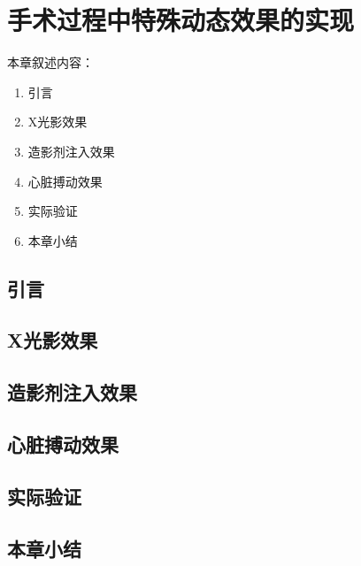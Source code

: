 \chapter{手术过程中特殊动态效果的实现}
\label{chap6}

本章叙述内容：
\begin{enumerate}
  \item 引言
  \item X光影效果
  \item 造影剂注入效果
  \item 心脏搏动效果
  \item 实际验证
  \item 本章小结
\end{enumerate}

\section{引言}

\section{X光影效果}
\label{sec6.2}

\section{造影剂注入效果}

\cite{Taylor2010Review}

\section{心脏搏动效果}

\section{实际验证}

\section{本章小结} 